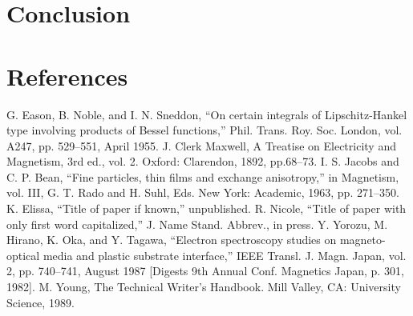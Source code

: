 \documentclass[conference]{IEEEtran}
\begin{document}
\section{Conclusion}


\section{References}



\begin{thebibliography}{00}
 G. Eason, B. Noble, and I. N. Sneddon, ``On certain integrals of Lipschitz-Hankel type involving products of Bessel functions,'' Phil. Trans. Roy. Soc. London, vol. A247, pp. 529--551, April 1955.
 J. Clerk Maxwell, A Treatise on Electricity and Magnetism, 3rd ed., vol. 2. Oxford: Clarendon, 1892, pp.68--73.
 I. S. Jacobs and C. P. Bean, ``Fine particles, thin films and exchange anisotropy,'' in Magnetism, vol. III, G. T. Rado and H. Suhl, Eds. New York: Academic, 1963, pp. 271--350.
 K. Elissa, ``Title of paper if known,'' unpublished.
 R. Nicole, ``Title of paper with only first word capitalized,'' J. Name Stand. Abbrev., in press.
 Y. Yorozu, M. Hirano, K. Oka, and Y. Tagawa, ``Electron spectroscopy studies on magneto-optical media and plastic substrate interface,'' IEEE Transl. J. Magn. Japan, vol. 2, pp. 740--741, August 1987 [Digests 9th Annual Conf. Magnetics Japan, p. 301, 1982].
 M. Young, The Technical Writer's Handbook. Mill Valley, CA: University Science, 1989.
\end{thebibliography}
\vspace{12pt}
\end{document}
